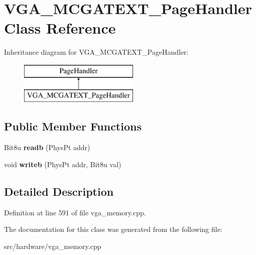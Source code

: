 \hypertarget{classVGA__MCGATEXT__PageHandler}{\section{V\-G\-A\-\_\-\-M\-C\-G\-A\-T\-E\-X\-T\-\_\-\-Page\-Handler Class Reference}
\label{classVGA__MCGATEXT__PageHandler}
}
Inheritance diagram for V\-G\-A\-\_\-\-M\-C\-G\-A\-T\-E\-X\-T\-\_\-\-Page\-Handler\-:\begin{figure}[H]
\begin{center}
\leavevmode
\includegraphics[height=2.000000cm]{classVGA__MCGATEXT__PageHandler}
\end{center}
\end{figure}
\subsection*{Public Member Functions}
\begin{DoxyCompactItemize}
\item 
\hypertarget{classVGA__MCGATEXT__PageHandler_af89d10f79b96e8172aa46a273bad0407}{Bit8u {\bfseries readb} (Phys\-Pt addr)}\label{classVGA__MCGATEXT__PageHandler_af89d10f79b96e8172aa46a273bad0407}

\item 
\hypertarget{classVGA__MCGATEXT__PageHandler_a16752b37caf2a5687dd70f7d92533b55}{void {\bfseries writeb} (Phys\-Pt addr, Bit8u val)}\label{classVGA__MCGATEXT__PageHandler_a16752b37caf2a5687dd70f7d92533b55}

\end{DoxyCompactItemize}


\subsection{Detailed Description}


Definition at line 591 of file vga\-\_\-memory.\-cpp.



The documentation for this class was generated from the following file\-:\begin{DoxyCompactItemize}
\item 
src/hardware/vga\-\_\-memory.\-cpp\end{DoxyCompactItemize}
